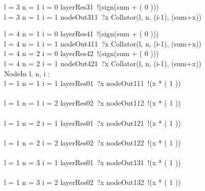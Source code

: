 \documentclass{article}
\begin{document}
\begin{figure}[p]
\begin{circus}
      \lcircguard l = 3 \land n = 1 \land i = 0 \rcircguard \circguard layerRes31~!(sign(sum + ( 0 ))) \then \Skip \\%
      \extchoice
      \lcircguard l = 3 \land n = 1 \land i = 1 \rcircguard \circguard nodeOut311~?x \then Collator(l, n, (i-1), (sum+x)) \\%
      \extchoice
      
      \lcircguard l = 4 \land n = 1 \land i = 0 \rcircguard \circguard layerRes41~!(sign(sum + ( 0 ))) \then \Skip \\%
      \extchoice
      \lcircguard l = 4 \land n = 1 \land i = 1 \rcircguard \circguard nodeOut411~?x \then Collator(l, n, (i-1), (sum+x)) \\%
      \extchoice
      \lcircguard l = 4 \land n = 2 \land i = 0 \rcircguard \circguard layerRes42~!(sign(sum + ( 0 ))) \then \Skip \\%
      \extchoice
      \lcircguard l = 4 \land n = 2 \land i = 1 \rcircguard \circguard nodeOut421~?x \then Collator(l, n, (i-1), (sum+x)) \\%
      
      
      NodeIn \circdef l, n, i : \nat \circspot \\%
      \lcircguard l = 1 \land n = 1 \land i = 1 \rcircguard \circguard layerRes01~?x \then nodeOut111~!(x * ( 1 )) \then \Skip \\%
      \extchoice \\%
      \lcircguard l = 1 \land n = 1 \land i = 2 \rcircguard \circguard layerRes02~?x \then nodeOut112~!(x * ( 1 )) \then \Skip \\%
      \extchoice \\%
      \lcircguard l = 1 \land n = 2 \land i = 1 \rcircguard \circguard layerRes01~?x \then nodeOut121~!(x * ( 1 )) \then \Skip \\%
      \extchoice \\%
      \lcircguard l = 1 \land n = 2 \land i = 2 \rcircguard \circguard layerRes02~?x \then nodeOut122~!(x * ( 1 )) \then \Skip \\%
      \extchoice \\%
      \lcircguard l = 1 \land n = 3 \land i = 1 \rcircguard \circguard layerRes01~?x \then nodeOut131~!(x * ( 1 )) \then \Skip \\%
      \extchoice \\%
      \lcircguard l = 1 \land n = 3 \land i = 2 \rcircguard \circguard layerRes02~?x \then nodeOut132~!(x * ( 1 )) \then \Skip \\%
      \extchoice \\%
      

\end{circus}
\end{figure}
\end{document}
